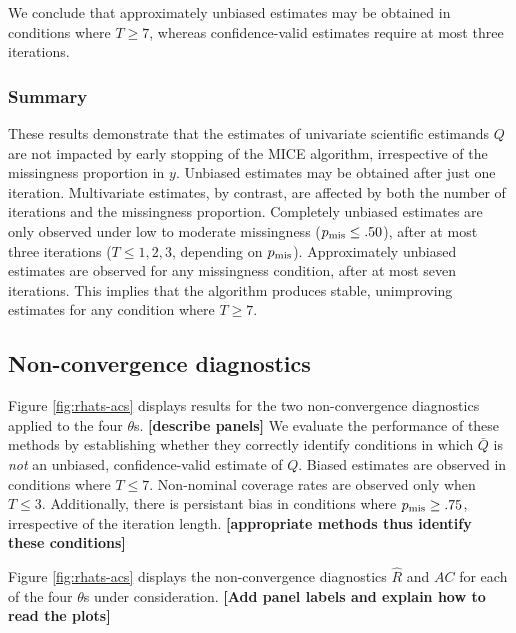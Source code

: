 \documentclass[Royal,times,sageh]{sagej}
\begin{document}
We conclude that approximately unbiased estimates may be obtained in conditions where \(T\geq7\), whereas confidence-valid estimates require at most three iterations.

\hypertarget{summary}{%
\subsubsection{Summary}\label{summary}}

These results demonstrate that the estimates of univariate scientific estimands \(Q\) are not impacted by early stopping of the MICE algorithm, irrespective of the missingness proportion in \(y\). Unbiased estimates may be obtained after just one iteration. Multivariate estimates, by contrast, are affected by both the number of iterations and the missingness proportion. Completely unbiased estimates are only observed under low to moderate missingness (\(p_{\rm mis}\leq.50\)), after at most three iterations (\(T\leq1,2,3\), depending on \(p_{\rm mis}\)). Approximately unbiased estimates are observed for any missingness condition, after at most seven iterations. This implies that the algorithm produces stable, unimproving estimates for any condition where \(T\geq7\).

\hypertarget{non-convergence-diagnostics-1}{%
\subsection{Non-convergence diagnostics}\label{non-convergence-diagnostics-1}}

Figure \ref{fig:rhats-acs} displays results for the two non-convergence diagnostics applied to the four \(\theta\)s. \textbf{{[}describe panels{]}} We evaluate the performance of these methods by establishing whether they correctly identify conditions in which \(\bar{Q}\) is \emph{not} an unbiased, confidence-valid estimate of \(Q\). Biased estimates are observed in conditions where \(T\leq7\). Non-nominal coverage rates are observed only when \(T\leq3\). Additionally, there is persistant bias in conditions where \(p_{\rm mis}\geq.75\), irrespective of the iteration length. \textbf{{[}appropriate methods thus identify these conditions{]}}

Figure \ref{fig:rhats-acs} displays the non-convergence diagnostics \(\widehat{R}\) and \(AC\) for each of the four \(\theta\)s under consideration. \textbf{{[}Add panel labels and explain how to read the plots{]}}
\end{document}
